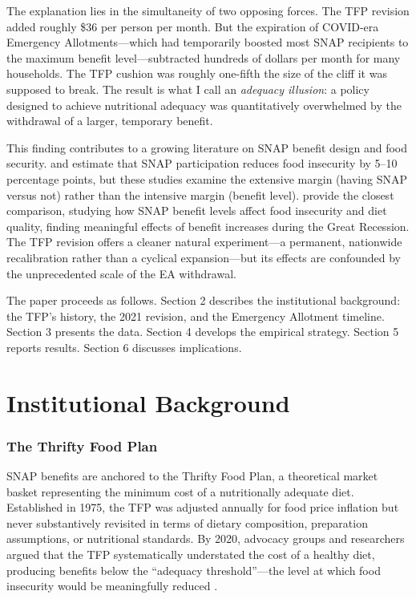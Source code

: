 \documentclass[12pt]{article}
\begin{document}
The explanation lies in the simultaneity of two opposing forces. The TFP revision added roughly \$36 per person per month. But the expiration of COVID-era Emergency Allotments---which had temporarily boosted most SNAP recipients to the maximum benefit level---subtracted hundreds of dollars per month for many households. The TFP cushion was roughly one-fifth the size of the cliff it was supposed to break. The result is what I call an \emph{adequacy illusion}: a policy designed to achieve nutritional adequacy was quantitatively overwhelmed by the withdrawal of a larger, temporary benefit.

This finding contributes to a growing literature on SNAP benefit design and food security. \citet{ratcliffe2011} and \citet{mabli2010} estimate that SNAP participation reduces food insecurity by 5--10 percentage points, but these studies examine the extensive margin (having SNAP versus not) rather than the intensive margin (benefit level). \citet{bitler2023} provide the closest comparison, studying how SNAP benefit levels affect food insecurity and diet quality, finding meaningful effects of benefit increases during the Great Recession. The TFP revision offers a cleaner natural experiment---a permanent, nationwide recalibration rather than a cyclical expansion---but its effects are confounded by the unprecedented scale of the EA withdrawal.

The paper proceeds as follows. Section 2 describes the institutional background: the TFP's history, the 2021 revision, and the Emergency Allotment timeline. Section 3 presents the data. Section 4 develops the empirical strategy. Section 5 reports results. Section 6 discusses implications.


\section{Institutional Background}

\subsubsection*{The Thrifty Food Plan} SNAP benefits are anchored to the Thrifty Food Plan, a theoretical market basket representing the minimum cost of a nutritionally adequate diet. Established in 1975, the TFP was adjusted annually for food price inflation but never substantively revisited in terms of dietary composition, preparation assumptions, or nutritional standards. By 2020, advocacy groups and researchers argued that the TFP systematically understated the cost of a healthy diet, producing benefits below the ``adequacy threshold''---the level at which food insecurity would be meaningfully reduced \citep{ziliak2016, hoynes2016}.
\end{document}
